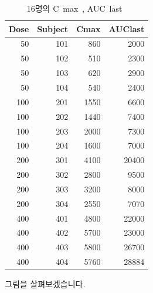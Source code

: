 \documentclass[12pt,]{krantz}
\begin{document}
\begin{table}

\caption{\label{tab:sad-pk}16명의 C~max~, AUC~last~}
\centering
\begin{tabular}[t]{r|r|r|r}
\hline
Dose & Subject & Cmax & AUClast\\
\hline
50 & 101 & 860 & 2000\\
\hline
50 & 102 & 510 & 2300\\
\hline
50 & 103 & 620 & 2900\\
\hline
50 & 104 & 540 & 2400\\
\hline
100 & 201 & 1550 & 6600\\
\hline
100 & 202 & 1440 & 7400\\
\hline
100 & 203 & 2000 & 7300\\
\hline
100 & 204 & 1600 & 7000\\
\hline
200 & 301 & 4100 & 20400\\
\hline
200 & 302 & 2800 & 9500\\
\hline
200 & 303 & 3200 & 8000\\
\hline
200 & 304 & 2550 & 7070\\
\hline
400 & 401 & 4800 & 22000\\
\hline
400 & 402 & 5700 & 23000\\
\hline
400 & 403 & 5800 & 26700\\
\hline
400 & 404 & 5760 & 28884\\
\hline
\end{tabular}
\end{table}

그림을 살펴보겠습니다.
\end{document}
